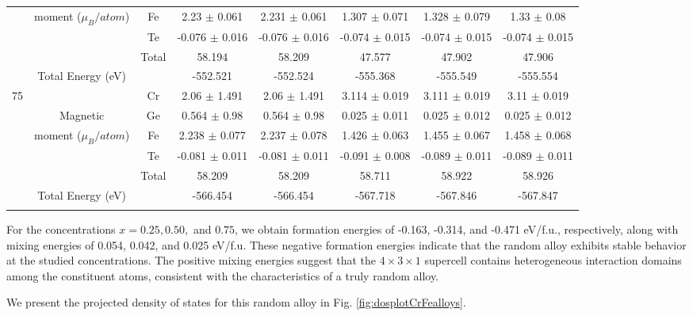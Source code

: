 \begin{table}[H]
{\begin{tabular}{cccccccc}
			& moment ($\mu_B /atom$) & Fe & 2.23 $\pm$ 0.061 & 2.231 $\pm$ 0.061 & 1.307 $\pm$ 0.071 & 1.328 $\pm$ 0.079 & 1.33 $\pm$ 0.08 \\ 
			& & Te & -0.076 $\pm$ 0.016 & -0.076 $\pm$ 0.016 & -0.074 $\pm$ 0.015 & -0.074 $\pm$ 0.015 & -0.074 $\pm$ 0.015 \\ 
			& & Total & 58.194 & 58.209 & 47.577 & 47.902 & 47.906 \\ 
			\midrule
			& Total Energy (eV) & & -552.521 & -552.524 & -555.368 & -555.549 & -555.554 \\ 		     
			\midrule
			\midrule
			\multirow{5}{*}{75} & & Cr & 2.06 $\pm$ 1.491 & 2.06 $\pm$ 1.491 & 3.114 $\pm$ 0.019 & 3.111 $\pm$ 0.019 & 3.11 $\pm$ 0.019 \\
			& Magnetic & Ge & 0.564 $\pm$ 0.98 & 0.564 $\pm$ 0.98 & 0.025 $\pm$ 0.011 & 0.025 $\pm$ 0.012 & 0.025 $\pm$ 0.012 \\ 
			& moment ($\mu_B /atom$) & Fe & 2.238 $\pm$ 0.077 & 2.237 $\pm$ 0.078 & 1.426 $\pm$ 0.063 & 1.455 $\pm$ 0.067 & 1.458 $\pm$ 0.068 \\ 
			& & Te & -0.081 $\pm$ 0.011 & -0.081 $\pm$ 0.011 & -0.091 $\pm$ 0.008 & -0.089 $\pm$ 0.011 & -0.089 $\pm$ 0.011 \\ 
			& & Total & 58.209 & 58.209 & 58.711 & 58.922 & 58.926 \\ 
			\midrule
			& Total Energy (eV) & & -566.454 & -566.454 & -567.718 & -567.846 & -567.847 \\ 		     
			\bottomrule
			\bottomrule
			\label{tab:4.14}
		\end{tabular}
	}
\end{table}

For the concentrations \( x = 0.25, 0.50, \) and \( 0.75 \), we obtain formation energies of -0.163, -0.314, and -0.471 eV/f.u., respectively, along with mixing energies of 0.054, 0.042, and 0.025 eV/f.u. These negative formation energies indicate that the random alloy exhibits stable behavior at the studied concentrations. The positive mixing energies suggest that the \( 4 \times 3 \times 1 \) supercell contains heterogeneous interaction domains among the constituent atoms, consistent with the characteristics of a truly random alloy.

We present the projected density of states for this random alloy in Fig. \ref{fig:dosplotCrFealloys}.

